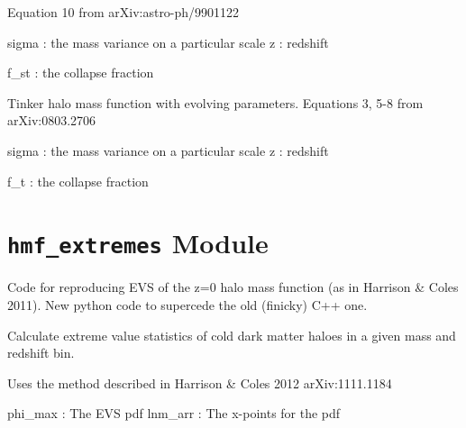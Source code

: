 \documentclass[letterpaper,10pt,english]{sphinxmanual}
\begin{document}
\begin{fulllineitems}
\begin{fulllineitems}
Equation 10 from arXiv:astro-ph/9901122

sigma : the mass variance on a particular scale
z : redshift

f\_st : the collapse fraction

\end{fulllineitems}


\begin{fulllineitems}
\label{PyCosmo:PyCosmo.hmf.Hmf.tinker}
Tinker halo mass function with evolving parameters.
Equations 3, 5-8 from arXiv:0803.2706

sigma : the mass variance on a particular scale
z : redshift

f\_t : the collapse fraction

\end{fulllineitems}


\end{fulllineitems}



\section{\texttt{hmf\_extremes} Module}
\label{PyCosmo:module-PyCosmo.hmf_extremes}\label{PyCosmo:hmf-extremes-module}
Code for reproducing EVS of the z=0 halo mass function
(as in Harrison \& Coles 2011). New python code to supercede the old (finicky)
C++ one.

\begin{fulllineitems}
\label{PyCosmo:PyCosmo.hmf_extremes.evs_bin_pdf}
Calculate extreme value statistics of cold dark matter haloes in a
given mass and redshift bin.

Uses the method described in Harrison \& Coles 2012 arXiv:1111.1184

phi\_max : The EVS pdf
lnm\_arr : The x-points for the pdf

\end{fulllineitems}
\end{document}
